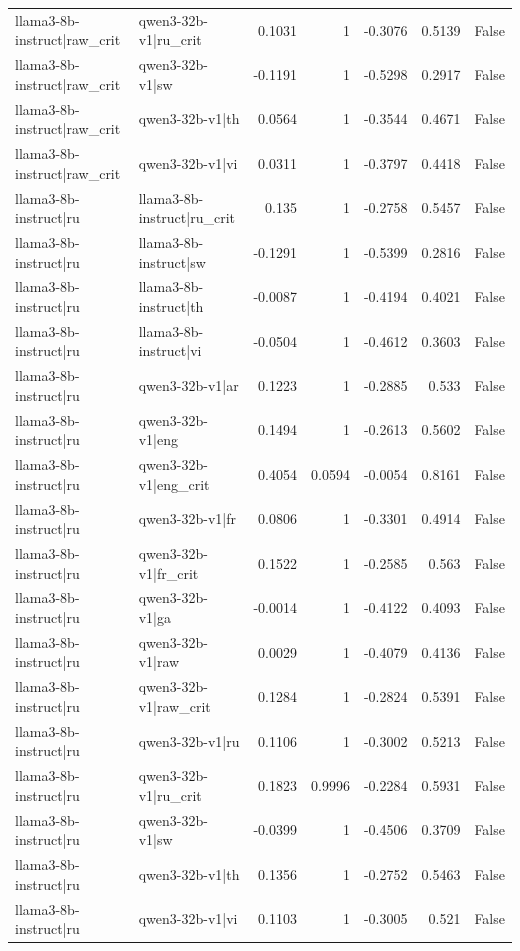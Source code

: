 \begin{table}
\begin{tabular}{l l r r r r l}
llama3-8b-instruct|raw_crit & qwen3-32b-v1|ru_crit & 0.1031 & 1 & -0.3076 & 0.5139 & False \\
llama3-8b-instruct|raw_crit & qwen3-32b-v1|sw & -0.1191 & 1 & -0.5298 & 0.2917 & False \\
llama3-8b-instruct|raw_crit & qwen3-32b-v1|th & 0.0564 & 1 & -0.3544 & 0.4671 & False \\
llama3-8b-instruct|raw_crit & qwen3-32b-v1|vi & 0.0311 & 1 & -0.3797 & 0.4418 & False \\
llama3-8b-instruct|ru & llama3-8b-instruct|ru_crit & 0.135 & 1 & -0.2758 & 0.5457 & False \\
llama3-8b-instruct|ru & llama3-8b-instruct|sw & -0.1291 & 1 & -0.5399 & 0.2816 & False \\
llama3-8b-instruct|ru & llama3-8b-instruct|th & -0.0087 & 1 & -0.4194 & 0.4021 & False \\
llama3-8b-instruct|ru & llama3-8b-instruct|vi & -0.0504 & 1 & -0.4612 & 0.3603 & False \\
llama3-8b-instruct|ru & qwen3-32b-v1|ar & 0.1223 & 1 & -0.2885 & 0.533 & False \\
llama3-8b-instruct|ru & qwen3-32b-v1|eng & 0.1494 & 1 & -0.2613 & 0.5602 & False \\
llama3-8b-instruct|ru & qwen3-32b-v1|eng_crit & 0.4054 & 0.0594 & -0.0054 & 0.8161 & False \\
llama3-8b-instruct|ru & qwen3-32b-v1|fr & 0.0806 & 1 & -0.3301 & 0.4914 & False \\
llama3-8b-instruct|ru & qwen3-32b-v1|fr_crit & 0.1522 & 1 & -0.2585 & 0.563 & False \\
llama3-8b-instruct|ru & qwen3-32b-v1|ga & -0.0014 & 1 & -0.4122 & 0.4093 & False \\
llama3-8b-instruct|ru & qwen3-32b-v1|raw & 0.0029 & 1 & -0.4079 & 0.4136 & False \\
llama3-8b-instruct|ru & qwen3-32b-v1|raw_crit & 0.1284 & 1 & -0.2824 & 0.5391 & False \\
llama3-8b-instruct|ru & qwen3-32b-v1|ru & 0.1106 & 1 & -0.3002 & 0.5213 & False \\
llama3-8b-instruct|ru & qwen3-32b-v1|ru_crit & 0.1823 & 0.9996 & -0.2284 & 0.5931 & False \\
llama3-8b-instruct|ru & qwen3-32b-v1|sw & -0.0399 & 1 & -0.4506 & 0.3709 & False \\
llama3-8b-instruct|ru & qwen3-32b-v1|th & 0.1356 & 1 & -0.2752 & 0.5463 & False \\
llama3-8b-instruct|ru & qwen3-32b-v1|vi & 0.1103 & 1 & -0.3005 & 0.521 & False \\

\end{tabular}
\end{table}
